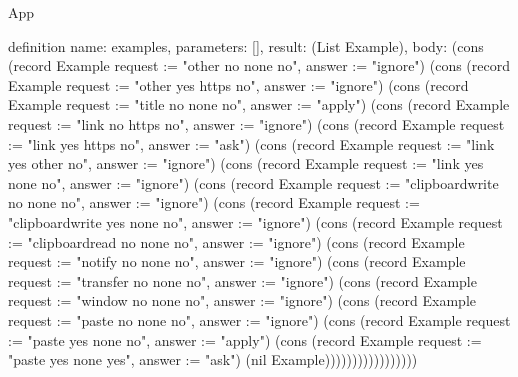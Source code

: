 \begin{lexlean}{App}
\begin{semanticmodule}
definition{
  name: examples,
  parameters: [],
  result: (List Example),
  body: (cons (record Example {request := "other no none no", answer := "ignore"}) (cons (record Example {request := "other yes https no", answer := "ignore"}) (cons (record Example {request := "title no none no", answer := "apply"}) (cons (record Example {request := "link no https no", answer := "ignore"}) (cons (record Example {request := "link yes https no", answer := "ask"}) (cons (record Example {request := "link yes other no", answer := "ignore"}) (cons (record Example {request := "link yes none no", answer := "ignore"}) (cons (record Example {request := "clipboardwrite no none no", answer := "ignore"}) (cons (record Example {request := "clipboardwrite yes none no", answer := "ignore"}) (cons (record Example {request := "clipboardread no none no", answer := "ignore"}) (cons (record Example {request := "notify no none no", answer := "ignore"}) (cons (record Example {request := "transfer no none no", answer := "ignore"}) (cons (record Example {request := "window no none no", answer := "ignore"}) (cons (record Example {request := "paste no none no", answer := "ignore"}) (cons (record Example {request := "paste yes none no", answer := "apply"}) (cons (record Example {request := "paste yes none yes", answer := "ask"}) (nil Example)))))))))))))))))
}
\end{semanticmodule}
\end{lexlean}
